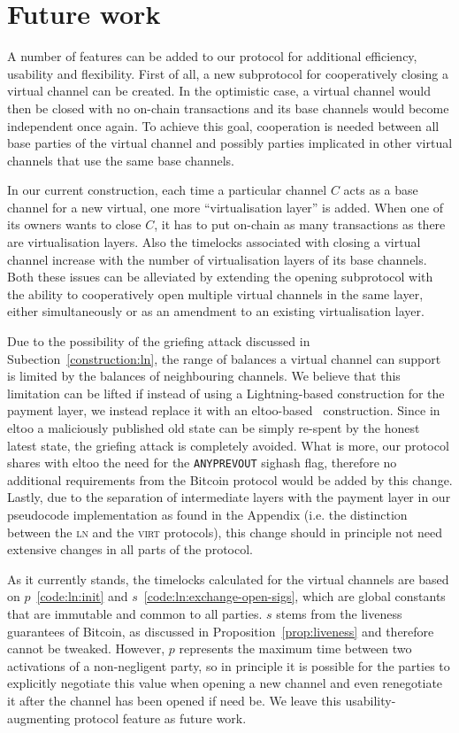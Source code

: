 \section{Future work}
  A number of features can be added to our protocol for additional efficiency,
  usability and flexibility. First of all, a new subprotocol for cooperatively
  closing a virtual channel can be created. In the optimistic case, a virtual
  channel would then be closed with no on-chain transactions and its base
  channels would become independent once again. To achieve this goal,
  cooperation is needed between all base parties of the virtual channel and
  possibly parties implicated in other virtual channels that use the same base
  channels.

  In our current construction, each time a particular channel $C$ acts as a base
  channel for a new virtual, one more ``virtualisation layer'' is added. When
  one of its owners wants to close $C$, it has to put on-chain as many
  transactions as there are virtualisation layers. Also the timelocks associated
  with closing a virtual channel increase with the number of virtualisation
  layers of its base channels. Both these issues can be alleviated by extending
  the opening subprotocol with the ability to cooperatively open multiple
  virtual channels in the same layer, either simultaneously or as an amendment
  to an existing virtualisation layer.

  Due to the possibility of the griefing attack discussed in
  Subection~\ref{construction:ln}, the range of balances a virtual channel can
  support is limited by the balances of neighbouring channels. We believe that
  this limitation can be lifted if instead of using a Lightning-based
  construction for the payment layer, we instead replace it with an
  eltoo-based~\cite{eltoo} construction. Since in eltoo a maliciously published
  old state can be simply re-spent by the honest latest state, the griefing
  attack is completely avoided. What is more, our protocol shares with eltoo the
  need for the \texttt{ANYPREVOUT} sighash flag, therefore no additional
  requirements from the Bitcoin protocol would be added by this change. Lastly,
  due to the separation of intermediate layers with the payment layer in our
  pseudocode implementation as found in the Appendix (i.e. the distinction
  between the \textsc{ln} and the \textsc{virt} protocols), this change should
  in principle not need extensive changes in all parts of the protocol.

  As it currently stands, the timelocks calculated for the virtual channels are
  based on $p$~\ref{code:ln:init} and $s$~\ref{code:ln:exchange-open-sigs},
  which are global constants that are immutable and common to all parties. $s$
  stems from the liveness guarantees of Bitcoin, as discussed in
  Proposition~\ref{prop:liveness} and therefore cannot be tweaked. However, $p$
  represents the maximum time between two activations of a non-negligent party,
  so in principle it is possible for the parties to explicitly negotiate this
  value when opening a new channel and even renegotiate it after the channel has
  been opened if need be. We leave this usability-augmenting protocol feature as
  future work.

